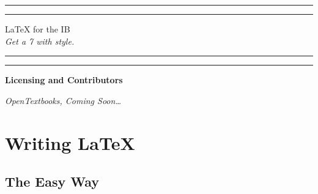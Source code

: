 \documentclass[12pt,a4paper]{article}
\begin{document}

\begin{titlepage}
\centering %
\scshape %
\vfill

\rule{\textwidth}{1.6pt}\vspace*{-\baselineskip}\vspace*{2pt}
\rule{\textwidth}{0.4pt}

\vspace{1.5\baselineskip} %
\LARGE{\LaTeX{} for the IB}\\
\vspace{0.2\baselineskip}
\small{\textit{Get a 7 with style.}}
\vspace{0.75\baselineskip} %

\rule{\textwidth}{0.4pt}\vspace*{-\baselineskip}\vspace{3.2pt}
\rule{\textwidth}{1.6pt}

\vfill
\end{titlepage}



\begin{center}
\Large{\textbf{Licensing and Contributors}}

\vfill
\small{\textit{OpenTextbooks, Coming Soon\texttrademark\dots}}
\vfill

\newpage
\end{center}

\begin{center}
\tableofcontents
\newpage
\end{center}





\newpage
\section{Writing LaTeX}

\subsection{The Easy Way}
\end{document}

